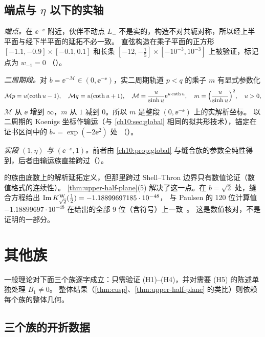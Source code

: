 \subsection{端点与 $\eta$ 以下的实轴}

\emph{端点。}在 $\ee^{-\ee}$ 附近，伙伴不动点 $L_-$ 不是实的，构造不对共轭对称，所以经上半平面与经下半平面的延拓不必一致。
直弦构造在乘子平面的正方形 $[-1.1,-0.9]\times[-0.1,0.1]$ 和长条 $[-12,-\tfrac15]\times[-10^{-3},10^{-3}]$ 上被验证，标记点为 $w_{-1}=0$
（\cite[定理~10.43]{KneserPaper}）。

\emph{二周期段。}对 $b=\ee^{-\mathcal M}\in(0,\ee^{-\ee})$，实二周期轨道 $p<q$ 的乘子 $m$ 有显式参数化
\[
  \mathcal Mp=u(\coth u-1),\quad \mathcal Mq=u(\coth u+1),\quad \mathcal M=\frac{u}{\sinh u}\mathrm{e}^{u\coth u},\quad m=\Bigl(\frac{u}{\sinh u}\Bigr)^2,\quad u>0,
\]
$\mathcal M$ 从 $\ee$ 增到 $\infty$，$m$ 从 $1$ 减到 $0$。所以 $m$ 是整段 $(0,\ee^{-\ee})$ 上的实解析坐标。
以二周期的 Koenigs 坐标作输运（与 \cref{ch10:sec:global} 相同的拟共形技术），锚定在证书区间中的 $b_*=\exp(-2\ee^2)$ 处
（\cite[定理~10.45]{KneserPaper}）。

\emph{实段 $(1,\eta)$ 与 $(\ee^{-\ee},1)$。}前者由 \cref{ch10:prop:global} 与缝合族的参数全纯性得到，后者由输运族直接跨过（\cite[命题~10.23]{KneserPaper}）。

\begin{remark}\label{ch10:rem:paulsen-family}
\cite{Paulsen2019} 的族由底数上的解析延拓定义，但那里跨过 Shell--Thron 边界只有数值论证（数值格式的连续性）。
\cref{thm:upper-half-plane}(5) 解决了这一点。在 $b=\sqrt2$ 处，缝合方程给出 $\operatorname{Im}K^{\mathrm W}_{\sqrt2}(\tfrac12)=-1.18899697185\cdot10^{-48}$，
与 Paulsen 的 120 位计算值 $-1.18899697\cdot10^{-48}$ 在给出的全部 9 位（含符号）上一致~\cite[第~11~节]{KneserPaper}。
这是数值核对，不是证明的一部分。
\end{remark}

\section{其他族}\label{ch10:sec:other}

一般理论对下面三个族逐字成立：只需验证 (H1)--(H4)，并对需要 (H5) 的陈述单独处理 $B_1\neq0$。
整体结果（\cref{thm:cusp}、\cref{thm:upper-half-plane} 的类比）则依赖每个族的整体几何。

\subsection{三个族的开折数据}

